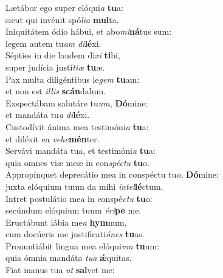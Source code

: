 \evenverse Lætábor ego super elóqui\textit{a} \textbf{tu}a:~\*\\
\evenverse sicut qui invénit spó\textit{li}\textit{a} \textbf{mul}ta.\\
\oddverse Iniquitátem ódio hábui, et abo\textit{mi}\textbf{ná}tus sum:~\*\\
\oddverse legem autem tu\textit{am} \textit{di}\textbf{lé}xi.\\
\evenverse Sépties in die laudem di\textit{xi} \textbf{ti}bi,~\*\\
\evenverse super judícia justí\textit{ti}\textit{æ} \textbf{tu}æ.\\
\oddverse Pax multa diligéntibus le\textit{gem} \textbf{tu}am:~\*\\
\oddverse et non est \textit{il}\textit{lis} \textbf{scán}dalum.\\
\evenverse Exspectábam salutáre tu\textit{um}, \textbf{Dó}mine:~\*\\
\evenverse et mandáta tu\textit{a} \textit{di}\textbf{lé}xi.\\
\oddverse Custodívit ánima mea testimóni\textit{a} \textbf{tu}a:~\*\\
\oddverse et diléxit ea \textit{ve}\textit{he}\textbf{mén}ter.\\
\evenverse Servávi mandáta tua, et testimóni\textit{a} \textbf{tu}a:~\*\\
\evenverse quia omnes viæ meæ in con\textit{spé}\textit{ctu} \textbf{tu}o.\\
\oddverse Appropínquet deprecátio mea in conspéctu tu\textit{o}, \textbf{Dó}mine:~\*\\
\oddverse juxta elóquium tuum da mihi \textit{in}\textit{tel}\textbf{lé}ctum.\\
\evenverse Intret postulátio mea in conspé\textit{ctu} \textbf{tu}o:~\*\\
\evenverse secúndum elóquium tuum \textit{é}\textit{ri}\textbf{pe} me.\\
\oddverse Eructábunt lábia me\textit{a} \textbf{hym}num,~\*\\
\oddverse cum docúeris me justificati\textit{ó}\textit{nes} \textbf{tu}as.\\
\evenverse Pronuntiábit lingua mea elóqui\textit{um} \textbf{tu}um:~\*\\
\evenverse quia ómnia mandáta \textit{tu}\textit{a} \textbf{ǽ}quitas.\\
\oddverse Fiat manus tua \textit{ut} \textbf{sal}vet me:~\*\\
